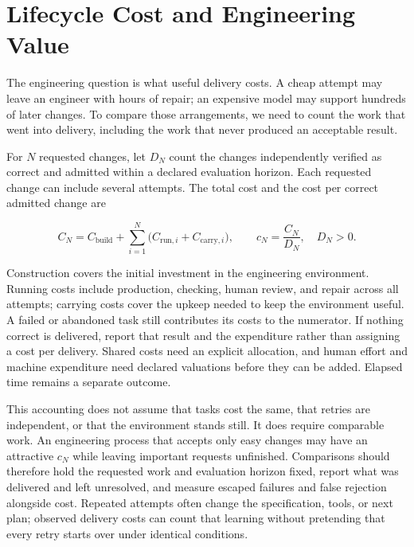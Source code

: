 \section{Lifecycle Cost and Engineering Value}\label{heading:cost-and-failure-separately}


The engineering question is what useful delivery costs. A cheap attempt may leave an engineer with hours of repair; an expensive model may support hundreds of later changes. To compare those arrangements, we need to count the work that went into delivery, including the work that never produced an acceptable result.

For \(N\) requested changes, let \(D_N\) count the changes independently verified as correct and admitted within a declared evaluation horizon. Each requested change can include several attempts. The total cost and the cost per correct admitted change are

\[
C_N=C_{\text{build}}+\sum_{i=1}^{N}\bigl(C_{\text{run},i}+C_{\text{carry},i}\bigr),
\qquad c_N=\frac{C_N}{D_N},\quad D_N>0.
\]

Construction covers the initial investment in the engineering environment. Running costs include production, checking, human review, and repair across all attempts; carrying costs cover the upkeep needed to keep the environment useful. A failed or abandoned task still contributes its costs to the numerator. If nothing correct is delivered, report that result and the expenditure rather than assigning a cost per delivery. Shared costs need an explicit allocation, and human effort and machine expenditure need declared valuations before they can be added. Elapsed time remains a separate outcome.


This accounting does not assume that tasks cost the same, that retries are independent, or that the environment stands still. It does require comparable work. An engineering process that accepts only easy changes may have an attractive \(c_N\) while leaving important requests unfinished. Comparisons should therefore hold the requested work and evaluation horizon fixed, report what was delivered and left unresolved, and measure escaped failures and false rejection alongside cost. Repeated attempts often change the specification, tools, or next plan; observed delivery costs can count that learning without pretending that every retry starts over under identical conditions.

